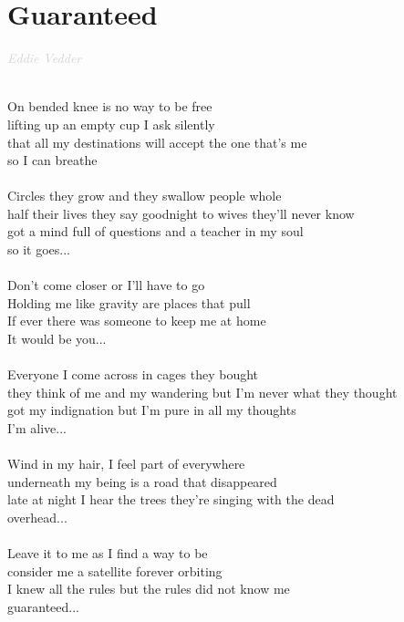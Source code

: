 \documentclass[a5paper, 10pt]{book}
\begin{document}
\section{Guaranteed}\textcolor{lightgray}{\textit{Eddie Vedder}}\\~\\
\begin{minipage}[t]{0.84\textwidth}
  On bended knee is no way to be free \\
  lifting up an empty cup I ask silently\\
  that all my destinations will accept the one that's me\\
  so I can breathe \\
  \\
  Circles they grow and they swallow people whole\\
  half their lives they say goodnight to wives they'll never know\\
  got a mind full of questions and a teacher in my soul \\
  so it goes... \\
  \\
  Don't come closer or I'll have to go\\
  Holding me like gravity are places that pull \\
  If ever there was someone to keep me at home \\
  It would be you...\\
  \\
  Everyone I come across in cages they bought\\
  they think of me and my wandering but I'm never what they thought \\
  got my indignation but I'm pure in all my thoughts \\
  I'm alive... \\
  \\
  Wind in my hair, I feel part of everywhere \\
  underneath my being is a road that disappeared \\
  late at night I hear the trees they're singing with the dead \\
  overhead... \\
  \\
  Leave it to me as I find a way to be \\
  consider me a satellite forever orbiting \\
  I knew all the rules but the rules did not know me \\
  guaranteed...\\
  \\

\end{minipage}
\end{document}
